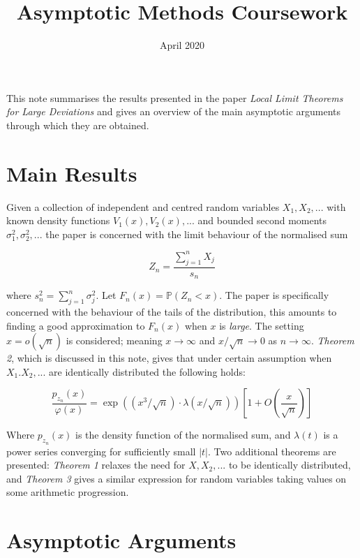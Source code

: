 \documentclass{article}
\title{Asymptotic Methods Coursework}
\date{April 2020}
\begin{document}
\maketitle

This note summarises the results presented in the paper \textit{Local Limit Theorems for Large Deviations} and gives an overview of the main asymptotic arguments through which they are obtained. 

\section*{Main Results}

Given a collection of independent and centred random variables $X_1, X_2, ...$ with known density functions $V_1(x), V_2(x),...$ and bounded second moments $\sigma_1^2, \sigma_2^2, ...$ the paper is concerned with the limit behaviour of the normalised sum

\begin{equation*}
    Z_n = \frac{\sum_{j=1}^nX_j}{s_n}
\end{equation*}

where $s_n^2 = \sum_{j=1}^n \sigma_j^2$. Let $F_n(x) = \mathbb{P}(Z_n < x)$. The paper is specifically concerned with the behaviour of the tails of the distribution, this amounts to finding a good approximation to $F_n(x)$ when $x$ is \textit{large}. The setting $x = o(\sqrt{n})$ is considered; meaning $x \rightarrow \infty$ and $x / \sqrt{n} \rightarrow 0$ as $n \rightarrow \infty$. \textit{Theorem 2}, which is discussed in this note, gives that under certain assumption when $X_1.X_2,...$ are identically distributed the following holds: 

\begin{equation*}
    \frac{p_{z_n}(x)}{\varphi(x)} = \exp \left ( (x^3 / \sqrt{n}) \cdot \lambda(x/\sqrt{n}) \right ) \left [ 1 + O(\frac{x}{\sqrt{n}}) \right ]
\end{equation*}

Where $p_{z_n}(x)$ is the density function of the normalised sum, and $\lambda(t)$ is a power series converging for sufficiently small $|t|$. Two additional theorems are presented: \textit{Theorem 1} relaxes the need for $X, X_2, ...$ to be identically distributed, and \textit{Theorem 3} gives a similar expression for random variables taking values on some arithmetic progression. 

\section*{Asymptotic Arguments}
\end{document}
